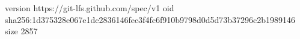 version https://git-lfs.github.com/spec/v1
oid sha256:1d375328e067e1dc2836146fec3f4fc6f910b9798d0d5d73b37296c2b1989146
size 2857
